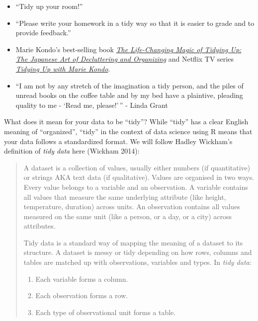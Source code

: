 \documentclass[
  letterpaper,
  DIV=11,
  numbers=noendperiod]{scrreprt}
\providecommand{\tightlist}{%
  \setlength{\itemsep}{0pt}\setlength{\parskip}{0pt}}\usepackage{longtable,booktabs,array}
\theoremstyle{definition}
\theoremstyle{remark}
\begin{document}
\begin{itemize}
\item
  ``Tidy up your room!''
\item
  ``Please write your homework in a tidy way so that it is easier to
  grade and to provide feedback.''
\item
  Marie Kondo's best-selling book
  \href{https://www.amazon.com/Life-Changing-Magic-Tidying-Decluttering-Organizing/dp/1607747308/ref=sr_1_1?ie=UTF8\&qid=1469400636\&sr=8-1\&keywords=tidying+up}{\emph{The
  Life-Changing Magic of Tidying Up: The Japanese Art of Decluttering
  and Organizing}} and Netflix TV series
  \href{https://www.netflix.com/title/80209379}{\emph{Tidying Up with
  Marie Kondo}}.
\item
  ``I am not by any stretch of the imagination a tidy person, and the
  piles of unread books on the coffee table and by my bed have a
  plaintive, pleading quality to me - `Read me, please!'\,'' - Linda
  Grant
\end{itemize}

What does it mean for your data to be ``tidy''? While ``tidy'' has a
clear English meaning of ``organized'', ``tidy'' in the context of data
science using R means that your data follows a standardized format. We
will follow Hadley Wickham's definition of \emph{tidy data} here
(Wickham 2014):

\begin{quote}
A dataset is a collection of values, usually either numbers (if
quantitative) or strings AKA text data (if qualitative). Values are
organised in two ways. Every value belongs to a variable and an
observation. A variable contains all values that measure the same
underlying attribute (like height, temperature, duration) across units.
An observation contains all values measured on the same unit (like a
person, or a day, or a city) across attributes.

Tidy data is a standard way of mapping the meaning of a dataset to its
structure. A dataset is messy or tidy depending on how rows, columns and
tables are matched up with observations, variables and types. In
\emph{tidy data}:

\begin{enumerate}
\def\labelenumi{\arabic{enumi}.}
\tightlist
\item
  Each variable forms a column.
\item
  Each observation forms a row.
\item
  Each type of observational unit forms a table.
\end{enumerate}
\end{quote}
\end{document}
